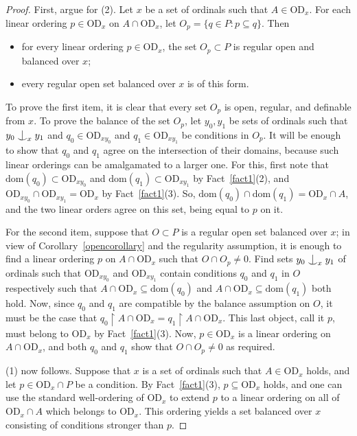 \documentclass{article}
\newcommand{\dom}{\mathrm{dom}}
\newcommand{\vd}{\mathrm{OD}}
\newcommand{\forkindep}[1][]{%
  \mathrel{
    \mathop{
      \vcenter{
        \hbox{\oalign{\noalign{\kern-.3ex}\hfil$\vert$\hfil\cr
              \noalign{\kern-.7ex}
              $\smile$\cr\noalign{\kern-.3ex}}}
      }
    }\displaylimits_{#1}
  }
}
\theoremstyle{definition}
\begin{document}
\begin{proof}
First, argue for (2). Let $x$ be a set of ordinals such that $A\in\vd_x$. For each linear ordering $p\in\vd_x$ on $A\cap\vd_x$, let $O_p=\{q\in P\colon p\subseteq q\}$. Then 

\begin{itemize}
\item for every linear ordering $p\in\vd_x$, the set $O_p\subset P$ is regular open and balanced over $x$;
\item every regular open set balanced over $x$ is of this form.
\end{itemize}

To prove the first item, it is clear that every set $O_p$ is open, regular, and definable from $x$. To prove the balance of the set $O_p$, let $y_0, y_1$ be sets of ordinals such that $y_0\forkindep[x]y_1$ and $q_0\in\vd_{xy_0}$ and $q_1\in\vd_{xy_1}$ be conditions in $O_p$. It will be enough to show that $q_0$ and $q_1$ agree on the intersection of their domains, because such linear orderings can be amalgamated to a larger one. For this, first note that $\dom(q_0)\subset\vd_{xy_0}$ and $\dom(q_1)\subset\vd_{xy_1}$ by Fact~\ref{fact1}(2), and $\vd_{xy_0}\cap\vd_{xy_1}=\vd_x$ by Fact~\ref{fact1}(3). So, $\dom(q_0)\cap\dom(q_1)=\vd_x\cap A$, and the two linear orders agree on this set, being equal to $p$ on it.

For the second item, suppose that $O\subset P$ is a regular open set balanced over $x$; in view of Corollary~\ref{opencorollary} and the regularity assumption, it is enough to find a linear ordering $p$ on $A\cap\vd_x$ such that $O\cap O_p\neq 0$. Find sets $y_0\forkindep[x]y_1$ of ordinals such that $\vd_{xy_0}$ and $\vd_{xy_1}$ contain conditions $q_0$ and $q_1$ in $O$ respectively such that $A\cap\vd_x\subseteq\dom(q_0)$ and $A\cap\vd_x\subseteq\dom(q_1)$ both hold. Now, since $q_0$ and $q_1$ are compatible by the balance assumption on $O$, it must be the case that $q_0\restriction A\cap\vd_x=q_1\restriction A\cap\vd_x$. This last object, call it $p$, must belong to $\vd_x$ by Fact~\ref{fact1}(3). Now, $p\in\vd_x$ is a linear ordering on $A\cap\vd_x$, and both $q_0$ and $q_1$ show that $O\cap O_p\neq 0$ as required.

(1) now follows. Suppose that $x$ is a set of ordinals such that $A\in\vd_x$ holds, and let $p\in\vd_x\cap P$ be a condition. By Fact~\ref{fact1}(3), $p\subseteq\vd_x$ holds, and one can use the standard well-ordering of $\vd_x$ to extend $p$ to a linear ordering on all of $\vd_x\cap A$ which belongs to $\vd_x$. This ordering yields a set balanced over $x$ consisting of conditions stronger than $p$.
\end{proof}
\end{document}

